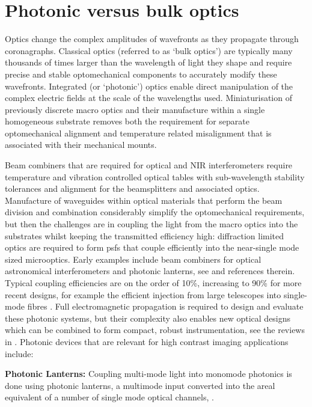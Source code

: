 \documentclass[letterpaper]{ar-1col}
\begin{document}
\section{Photonic versus bulk optics}

Optics change the complex amplitudes of wavefronts as they propagate through coronagraphs.
%
Classical optics (referred to as `bulk optics') are typically many thousands of times larger than the wavelength of light they shape and require precise and stable optomechanical components to accurately modify these wavefronts.
%
Integrated (or `photonic') optics enable direct manipulation of the complex electric fields at the scale of the wavelengths used.
%
Miniaturisation of previously discrete macro optics and their manufacture within a single homogeneous substrate removes both the requirement for separate optomechanical alignment and temperature related misalignment that is associated with their mechanical mounts.
%

Beam combiners that are required for optical and NIR interferometers require temperature and vibration controlled optical tables with sub-wavelength stability tolerances and alignment for the beamsplitters and associated optics.
%
Manufacture of waveguides within optical materials that perform the beam division and combination considerably simplify the optomechanical requirements, but then the challenges are in coupling the light from the macro optics into the substrates whilst keeping the transmitted efficiency high: diffraction limited optics are required to form \acp{psf} that couple efficiently into the near-single mode sized microoptics.
%
Early examples include beam combiners for optical astronomical interferometers \citep[for example the IOTA/IONIC beam combiner; ][]{Berger01} and photonic lanterns, see \citet{Leon-Saval10} and references therein.
%
Typical coupling efficiencies are on the order of 10\%, increasing to 90\% for more recent designs, for example the efficient injection from large telescopes into single-mode fibres \citep{Jovanovic17}.
%
Full electromagnetic propagation is required to design and evaluate these photonic systems, but their complexity also enables new optical designs which can be combined to form compact, robust instrumentation, see the reviews in \citet{Minardi21,Jovanovic23}.
%
Photonic devices that are relevant for high contrast imaging applications include:

{\bf Photonic Lanterns: } Coupling multi-mode light into monomode photonics is done using photonic lanterns, a multimode input converted into the areal equivalent of a number of single mode optical channels, \citep{Norris22}.
\end{document}

